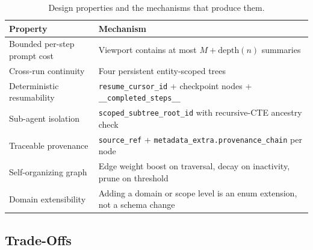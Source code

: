 \documentclass[11pt,a4paper]{article}
\theoremstyle{cortexprop}
\newcommand{\code}[1]{\texttt{#1}}
\begin{document}
\begin{table}[h]
\centering
\caption{Design properties and the mechanisms that produce them.}
\label{tab:properties}
\small
\begin{tabularx}{\linewidth}{lX}
\toprule
\textbf{Property} & \textbf{Mechanism}\\
\midrule
Bounded per-step prompt cost & Viewport contains at most $M + \text{depth}(n)$ summaries \\
Cross-run continuity & Four persistent entity-scoped trees \\
Deterministic resumability & \code{resume\_cursor\_id} + checkpoint nodes + \code{\_\_completed\_steps\_\_} \\
Sub-agent isolation & \code{scoped\_subtree\_root\_id} with recursive-CTE ancestry check \\
Traceable provenance & \code{source\_ref} + \code{metadata\_extra.provenance\_chain} per node \\
Self-organizing graph & Edge weight boost on traversal, decay on inactivity, prune on threshold \\
Domain extensibility & Adding a domain or scope level is an enum extension, not a schema change \\
\bottomrule
\end{tabularx}
\end{table}

\subsection{Trade-Offs}
\end{document}
